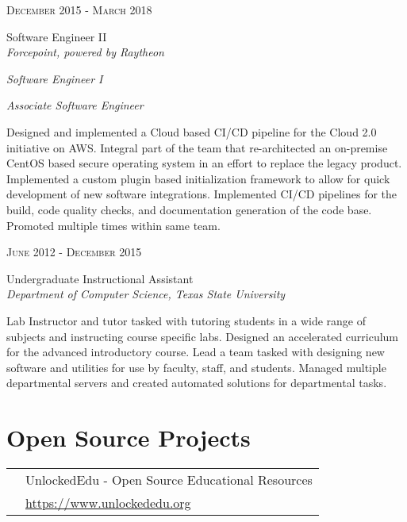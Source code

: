 \documentclass[10pt]{article} %
\begin{document}
\begin{minipage}[t]{0.5\textwidth}

{\raggedleft\textsc{December 2015 - March 2018}\par}

{
\raggedright\large Software Engineer II\\
\textit{Forcepoint, powered by Raytheon}\\
\raggedright\small \textit{Software Engineer I}\\
\raggedright\small \textit{Associate Software Engineer}\\
}

\normalsize{Designed and implemented a Cloud based CI/CD pipeline for the Cloud 2.0 initiative on AWS. Integral part of the team that re-architected an on-premise CentOS based secure operating system in an effort to replace the legacy product. Implemented a custom plugin based initialization framework to allow for quick development of new software integrations. Implemented CI/CD pipelines for the build, code quality checks, and documentation generation of the code base. Promoted multiple times within same team.}\\



{\raggedleft\textsc{June 2012 - December 2015}\par}

{\raggedright\large Undergraduate Instructional Assistant\\
\textit{Department of Computer Science, Texas State University}\\[5pt]}

\normalsize{Lab Instructor and tutor tasked with tutoring students in a wide range of subjects and instructing course specific labs. Designed an accelerated curriculum for the advanced introductory course. Lead a team tasked with designing new software and utilities for use by faculty, staff, and students. Managed multiple departmental servers and created automated solutions for departmental tasks.}\\

\section{Open Source Projects}

\begin{tabular}{rl}
& UnlockedEdu - Open Source Educational Resources\\
& \quad \href{https://www.unlockededu.org}{https://www.unlockededu.org} \\
\end{tabular}\\[10pt]




\end{minipage} %
\end{document}
